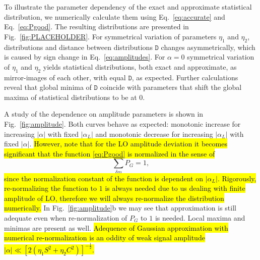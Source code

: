 To illustrate the parameter dependency of the exact and approximate statistical distribution, we numerically calculate them using Eq.~\eqref{eq:accurate} and Eq.~\eqref{eq:Pgood}. The resulting distributions are presented in Fig.~\ref{fig:PLACEHOLDER}. For symmetrical variation of parameters $\eta_1$ and $\eta_2$, distributions and distance between distributions $\mathtt{D}$ changes asymmetrically, which is caused by sign change in Eq.~\eqref{eq:amplitudes}. For $\alpha=0$ symmetrical variation of $\eta_1$ and $\eta_2$ yields statistical distributions, both exact and approximate, as mirror-images of each other, with equal $\mathtt{D}$, as expected. Further calculations reveal that global minima of $\mathtt{D}$ coincide with parameters that shift the global maxima of statistical distributions to be at $0$.

A study of the dependence on amplitude parameters is shown in Fig.~\ref{fig:amplitude}. Both curves behave as expected: monotonic increase for increasing $|\alpha|$ with fixed $|\alpha_L|$ and monotonic decrease for increasing $|\alpha_L|$ with fixed $|\alpha|$. \hl{However, note that for the LO amplitude deviation it becomes significant that the function {\eqref{eq:Pgood}} is normalized in the sense of}
\begin{equation}
    {\sum_{\delta m}
    P_G
    =1,}
    \label{eq:norm}
\end{equation}
\hl{since the normalization constant of the function is dependent on $|\alpha_L|$. Rigorously, re-normalizing the function to $1$ is always needed due to us dealing with finite amplitude of LO, therefore we will always re-normalize the distribution numerically.}
In Fig.~\ref{fig:amplitude}b we may see that approximation is still adequate even when re-normalization of $P_G$ to $1$ is needed. Local maxima and minimas are present as well. \hl{Adequence of Gaussian approximation with numerical re-normalization is an oddity of weak signal amplitude $|\alpha|\ll\left[2(\eta_1S^2+\eta_2C^2)\right]^{-\frac{1}{2}}$.}

